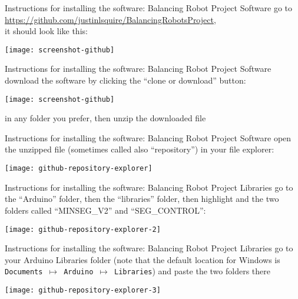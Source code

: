 \begin{frame}[t]{Instructions for installing the software: Balancing Robot Project Software}
	go to \url{https://github.com/justinlsquire/BalancingRobotsProject}, \\ it should look like this:
	\begin{center}
		\texttt{[image: screenshot-github]}
	\end{center}
\end{frame}


\begin{frame}[t]{Instructions for installing the software: Balancing Robot Project Software}
	download the software by clicking the ``clone or download'' button:
	\begin{center}
		\texttt{[image: screenshot-github]}
	\end{center}
	in any folder you prefer, then unzip the downloaded file
\end{frame}


\begin{frame}{Instructions for installing the software: Balancing Robot Project Software}
	open the unzipped file (sometimes called also ``repository'') in your file explorer:
	\begin{center}
		\texttt{[image: github-repository-explorer]}
	\end{center}
\end{frame}


\begin{frame}{Instructions for installing the software: Balancing Robot Project Libraries}
	go to the ``Arduino'' folder, then the ``libraries'' folder, then highlight and  the two folders called ``MINSEG\_V2'' and ``SEG\_CONTROL'':
	\begin{center}
		\texttt{[image: github-repository-explorer-2]}
	\end{center}
\end{frame}


\begin{frame}{Instructions for installing the software: Balancing Robot Project Libraries}
	go to your Arduino Libraries folder (note that the default location for Windows is \texttt{Documents $\mapsto$ Arduino $\mapsto$ Libraries}) and paste the two folders there
	\begin{center}
		\texttt{[image: github-repository-explorer-3]}
	\end{center}
\end{frame}

